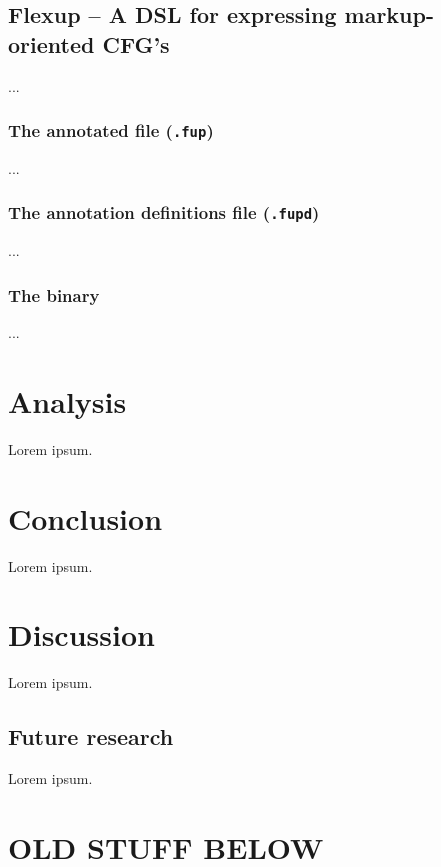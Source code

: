 \documentclass{scrreprt}
\begin{document}
\section{Flexup -- A DSL for expressing markup-oriented CFG's}
...

\subsection{The annotated file (\texttt{.fup})}
...

\subsection{The annotation definitions file (\texttt{.fupd})}
...

\subsection{The binary}
...





\chapter{Analysis}
Lorem ipsum.





\chapter{Conclusion}
Lorem ipsum.





\chapter{Discussion}
Lorem ipsum.

\section{Future research}
Lorem ipsum.













\chapter{OLD STUFF BELOW}
\end{document}
